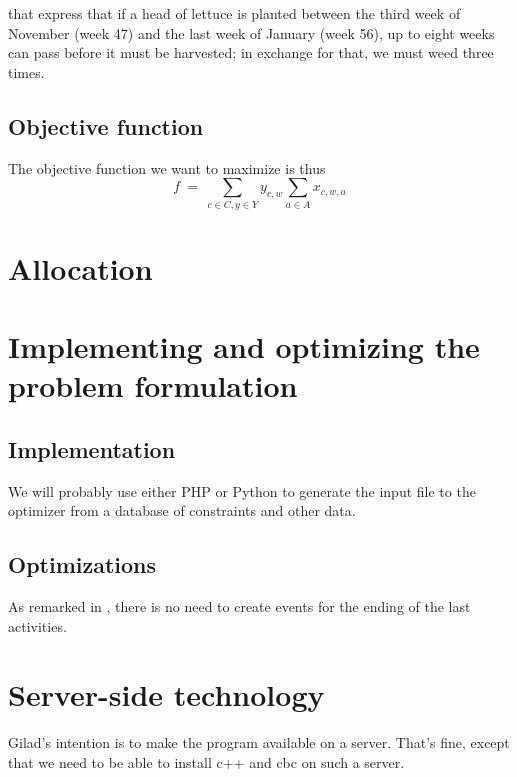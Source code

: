 \documentclass[11pt,reqno]{amsart}
\numberwithin{equation}{section}
\begin{document}
that express that if a head of lettuce is planted between the third week of November (week 47)
and the last week of January (week 56), up to eight weeks can pass before it must be
harvested; in exchange for that, we must weed three times. 


\subsection{Objective function}

The objective function we want to  maximize is thus
\[
   f 
   \ = \
   \sum_{c\in C, y\in Y} y_{c,w} \sum_{a\in A} x_{c,w,a}
\]


\section{Allocation}


\section{Implementing and optimizing the problem formulation}

\subsection{Implementation}

We will probably use either PHP or Python to generate the input file to the optimizer from
a database of constraints and other data.

\subsection{Optimizations}
As remarked in \cite{artigues-etal11}, there is no need to create
events for the ending of the last activities. 

\section{Server-side technology}

Gilad's intention is to make the program available on a server. That's
fine, except that we need to be able to install c++ and cbc on such a server.



\end{document}
